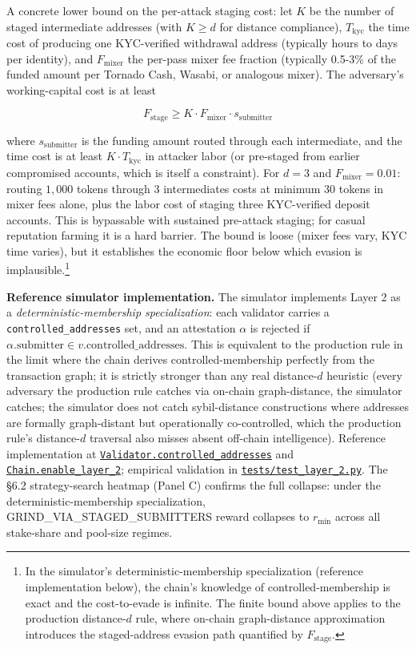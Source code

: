 \documentclass[
  11pt,
]{article}
\begin{document}
A concrete lower bound on the per-attack staging cost: let \(K\) be the
number of staged intermediate addresses (with \(K \geq d\) for distance
compliance), \(T_{\text{kyc}}\) the time cost of producing one
KYC-verified withdrawal address (typically hours to days per identity),
and \(F_{\text{mixer}}\) the per-pass mixer fee fraction (typically
0.5-3\% of the funded amount per Tornado Cash, Wasabi, or analogous
mixer). The adversary's working-capital cost is at least

\[F_{\text{stage}} \geq K \cdot F_{\text{mixer}} \cdot s_{\text{submitter}}\]

where \(s_{\text{submitter}}\) is the funding amount routed through each
intermediate, and the time cost is at least \(K \cdot T_{\text{kyc}}\)
in attacker labor (or pre-staged from earlier compromised accounts,
which is itself a constraint). For \(d = 3\) and
\(F_{\text{mixer}} = 0.01\): routing \(1{,}000\) tokens through 3
intermediates costs at minimum \(30\) tokens in mixer fees alone, plus
the labor cost of staging three KYC-verified deposit accounts. This is
bypassable with sustained pre-attack staging; for casual reputation
farming it is a hard barrier. The bound is loose (mixer fees vary, KYC
time varies), but it establishes the economic floor below which evasion
is implausible.\footnote{In the simulator's deterministic-membership
  specialization (reference implementation below), the chain's knowledge
  of controlled-membership is exact and the cost-to-evade is infinite.
  The finite bound above applies to the production distance-\(d\) rule,
  where on-chain graph-distance approximation introduces the
  staged-address evasion path quantified by \(F_{\text{stage}}\).}

\textbf{Reference simulator implementation.} The simulator implements
Layer 2 as a \emph{deterministic-membership specialization}: each
validator carries a \texttt{controlled\_addresses} set, and an
attestation \(\alpha\) is rejected if
\(\alpha.\text{submitter} \in v.\text{controlled\_addresses}\). This is
equivalent to the production rule in the limit where the chain derives
controlled-membership perfectly from the transaction graph; it is
strictly stronger than any real distance-\(d\) heuristic (every
adversary the production rule catches via on-chain graph-distance, the
simulator catches; the simulator does not catch sybil-distance
constructions where addresses are formally graph-distant but
operationally co-controlled, which the production rule's distance-\(d\)
traversal also misses absent off-chain intelligence). Reference
implementation at
\href{https://github.com/ligate-io/ligate-research/blob/main/prototypes/poua-sim/src/poua_sim/validator.py}{\texttt{Validator.controlled\_addresses}}
and
\href{https://github.com/ligate-io/ligate-research/blob/main/prototypes/poua-sim/src/poua_sim/chain.py}{\texttt{Chain.enable\_layer\_2}};
empirical validation in
\href{https://github.com/ligate-io/ligate-research/blob/main/prototypes/poua-sim/tests/test_layer_2.py}{\texttt{tests/test\_layer\_2.py}}.
The §6.2 strategy-search heatmap (Panel C) confirms the full collapse:
under the deterministic-membership specialization,
GRIND\_VIA\_STAGED\_SUBMITTERS reward collapses to \(r_{\min}\) across
all stake-share and pool-size regimes.
\end{document}
